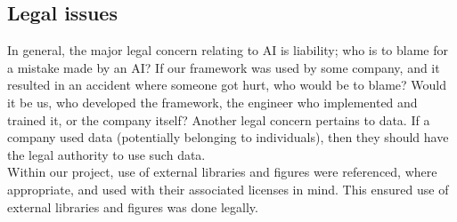 \begin{appendices}
\subsection{Legal issues}
In general, the major legal concern relating to AI is liability; who is to blame for a mistake made by an AI? If our framework was used by some company, and it resulted in an accident where someone got hurt, who would be to blame? Would it be us, who developed the framework, the engineer who implemented and trained it, or the company itself? Another legal concern pertains to data. If a company used data (potentially belonging to individuals), then they should have the legal authority to use such data.
\\Within our project, use of external libraries and figures were referenced, where appropriate, and used with their associated licenses in mind. This ensured use of external libraries and figures was done legally.


\end{appendices}
